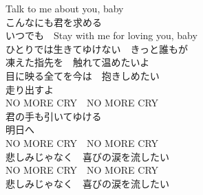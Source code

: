{Talk to me about you, baby　\\
こんなにも君を求める\\
いつでも　Stay with me for loving you, baby\\
ひとりでは生きてゆけない　きっと誰もが\\
凍えた指先を　触れて温めたいよ\\
目に映る全てを今は　抱きしめたい\\

走り出すよ\\NO MORE CRY　NO MORE CRY\\
君の手も引いてゆける\\
明日へ　\\NO MORE CRY　NO MORE CRY\\
悲しみじゃなく　喜びの涙を流したい\\

NO MORE CRY　NO MORE CRY\\
悲しみじゃなく　喜びの涙を流したい
}
